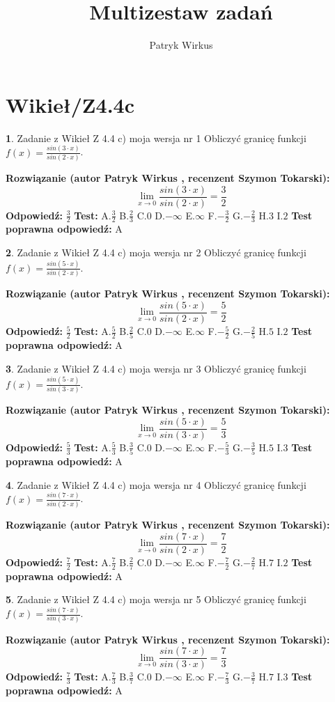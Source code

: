 \documentclass[12pt, a4paper]{article}
\title{Multizestaw zadań}
\author{Patryk Wirkus}
\date{}
\theoremstyle{definition} %
\newtheorem{zad}{}
\newcommand{\kategoria}[1]{\section{#1}}
\newcommand{\zadStart}[1]{\begin{zad}#1\newline}
\newcommand{\zadStop}{\end{zad}}
\newcommand{\rozwStart}[2]{\noindent \textbf{Rozwiązanie (autor #1 , recenzent #2): }\newline}
\newcommand{\rozwStop}{\newline}
\newcommand{\odpStart}{\noindent \textbf{Odpowiedź:}\newline}
\newcommand{\odpStop}{\newline}
\newcommand{\testStart}{\noindent \textbf{Test:}\newline}
\newcommand{\testStop}{\newline}
\newcommand{\kluczStart}{\noindent \textbf{Test poprawna odpowiedź:}\newline}
\newcommand{\kluczStop}{\newline}
\begin{document}
\maketitle

\kategoria{Wikieł/Z4.4c}


\zadStart{Zadanie z Wikieł Z 4.4 c) moja wersja nr 1}
Obliczyć granicę funkcji $f(x)=\frac{sin(3\cdot x)}{sin(2\cdot x)}$.
\zadStop
\rozwStart{Patryk Wirkus}{Szymon Tokarski}
$$\lim\limits_{x\to 0}\frac{sin(3\cdot x)}{sin(2\cdot x)}=
\frac{3}{2}$$
\rozwStop
\odpStart
$\frac{3}{2}$
\odpStop
\testStart
A.$\frac{3}{2}$
B.$\frac{2}{3}$
C.$0$
D.$-\infty$
E.$\infty$
F.$-\frac{3}{2}$
G.$-\frac{2}{3}$
H.$3$
I.$2$
\testStop
\kluczStart
A
\kluczStop



\zadStart{Zadanie z Wikieł Z 4.4 c) moja wersja nr 2}
Obliczyć granicę funkcji $f(x)=\frac{sin(5\cdot x)}{sin(2\cdot x)}$.
\zadStop
\rozwStart{Patryk Wirkus}{Szymon Tokarski}
$$\lim\limits_{x\to 0}\frac{sin(5\cdot x)}{sin(2\cdot x)}=
\frac{5}{2}$$
\rozwStop
\odpStart
$\frac{5}{2}$
\odpStop
\testStart
A.$\frac{5}{2}$
B.$\frac{2}{5}$
C.$0$
D.$-\infty$
E.$\infty$
F.$-\frac{5}{2}$
G.$-\frac{2}{5}$
H.$5$
I.$2$
\testStop
\kluczStart
A
\kluczStop



\zadStart{Zadanie z Wikieł Z 4.4 c) moja wersja nr 3}
Obliczyć granicę funkcji $f(x)=\frac{sin(5\cdot x)}{sin(3\cdot x)}$.
\zadStop
\rozwStart{Patryk Wirkus}{Szymon Tokarski}
$$\lim\limits_{x\to 0}\frac{sin(5\cdot x)}{sin(3\cdot x)}=
\frac{5}{3}$$
\rozwStop
\odpStart
$\frac{5}{3}$
\odpStop
\testStart
A.$\frac{5}{3}$
B.$\frac{3}{5}$
C.$0$
D.$-\infty$
E.$\infty$
F.$-\frac{5}{3}$
G.$-\frac{3}{5}$
H.$5$
I.$3$
\testStop
\kluczStart
A
\kluczStop



\zadStart{Zadanie z Wikieł Z 4.4 c) moja wersja nr 4}
Obliczyć granicę funkcji $f(x)=\frac{sin(7\cdot x)}{sin(2\cdot x)}$.
\zadStop
\rozwStart{Patryk Wirkus}{Szymon Tokarski}
$$\lim\limits_{x\to 0}\frac{sin(7\cdot x)}{sin(2\cdot x)}=
\frac{7}{2}$$
\rozwStop
\odpStart
$\frac{7}{2}$
\odpStop
\testStart
A.$\frac{7}{2}$
B.$\frac{2}{7}$
C.$0$
D.$-\infty$
E.$\infty$
F.$-\frac{7}{2}$
G.$-\frac{2}{7}$
H.$7$
I.$2$
\testStop
\kluczStart
A
\kluczStop



\zadStart{Zadanie z Wikieł Z 4.4 c) moja wersja nr 5}
Obliczyć granicę funkcji $f(x)=\frac{sin(7\cdot x)}{sin(3\cdot x)}$.
\zadStop
\rozwStart{Patryk Wirkus}{Szymon Tokarski}
$$\lim\limits_{x\to 0}\frac{sin(7\cdot x)}{sin(3\cdot x)}=
\frac{7}{3}$$
\rozwStop
\odpStart
$\frac{7}{3}$
\odpStop
\testStart
A.$\frac{7}{3}$
B.$\frac{3}{7}$
C.$0$
D.$-\infty$
E.$\infty$
F.$-\frac{7}{3}$
G.$-\frac{3}{7}$
H.$7$
I.$3$
\testStop
\kluczStart
A
\kluczStop
\end{document}
